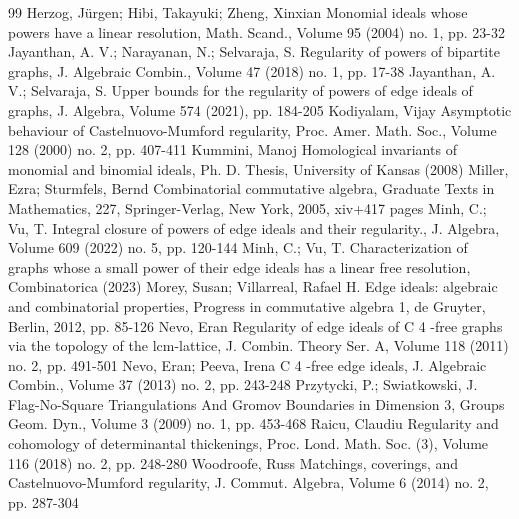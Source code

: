 \documentclass[10pt]{article}
\theoremstyle{definition}
\numberwithin{equation}{section}
\begin{document}
\begin{thebibliography}{99}
Herzog, Jürgen; Hibi, Takayuki; Zheng, Xinxian Monomial ideals whose powers have a linear resolution, Math. Scand., Volume 95 (2004) no. 1, pp. 23-32
Jayanthan, A. V.; Narayanan, N.; Selvaraja, S. Regularity of powers of bipartite graphs, J. Algebraic Combin., Volume 47 (2018) no. 1, pp. 17-38
Jayanthan, A. V.; Selvaraja, S. Upper bounds for the regularity of powers of edge ideals of graphs, J. Algebra, Volume 574 (2021), pp. 184-205
Kodiyalam, Vijay Asymptotic behaviour of Castelnuovo-Mumford regularity, Proc. Amer. Math. Soc., Volume 128 (2000) no. 2, pp. 407-411
Kummini, Manoj Homological invariants of monomial and binomial ideals, Ph. D. Thesis, University of Kansas (2008)
Miller, Ezra; Sturmfels, Bernd Combinatorial commutative algebra, Graduate Texts in Mathematics, 227, Springer-Verlag, New York, 2005, xiv+417 pages
Minh, C.; Vu, T. Integral closure of powers of edge ideals and their regularity., J. Algebra, Volume 609 (2022) no. 5, pp. 120-144
Minh, C.; Vu, T. Characterization of graphs whose a small power of their edge ideals has a linear free resolution, Combinatorica (2023)
Morey, Susan; Villarreal, Rafael H. Edge ideals: algebraic and combinatorial properties, Progress in commutative algebra 1, de Gruyter, Berlin, 2012, pp. 85-126
Nevo, Eran Regularity of edge ideals of C 4 -free graphs via the topology of the lcm-lattice, J. Combin. Theory Ser. A, Volume 118 (2011) no. 2, pp. 491-501
Nevo, Eran; Peeva, Irena C 4 -free edge ideals, J. Algebraic Combin., Volume 37 (2013) no. 2, pp. 243-248
Przytycki, P.; Swiatkowski, J. Flag-No-Square Triangulations And Gromov Boundaries in Dimension 3, Groups Geom. Dyn., Volume 3 (2009) no. 1, pp. 453-468
Raicu, Claudiu Regularity and cohomology of determinantal thickenings, Proc. Lond. Math. Soc. (3), Volume 116 (2018) no. 2, pp. 248-280
Woodroofe, Russ Matchings, coverings, and Castelnuovo-Mumford regularity, J. Commut. Algebra, Volume 6 (2014) no. 2, pp. 287-304
\end{thebibliography}
\end{document}
